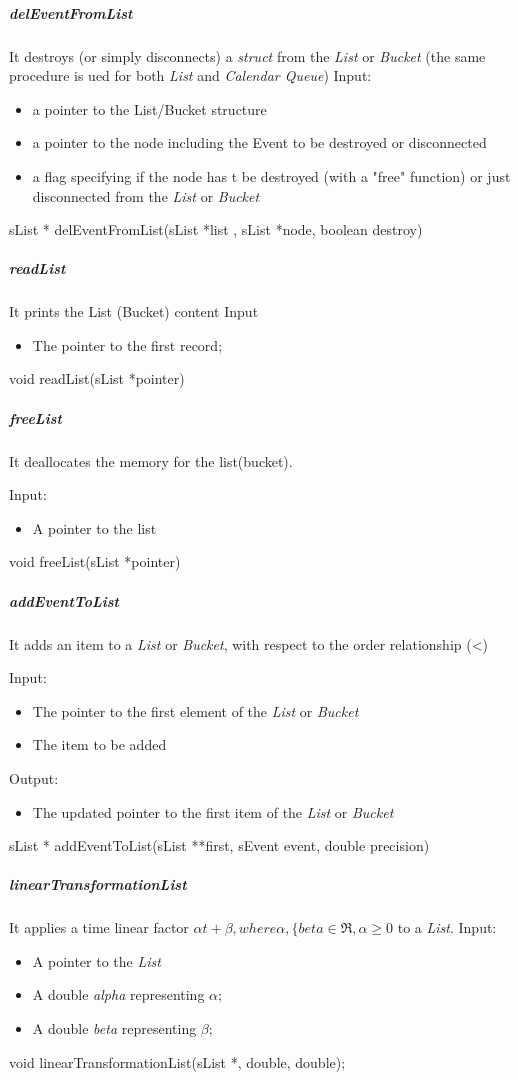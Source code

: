 \subparagraph{delEventFromList}

It destroys (or simply disconnects) a \textit{struct} from the \textit{List} or \textit{Bucket} (the same procedure is ued for both \textit{List} and \textit{Calendar Queue})
Input: 
\begin{itemize}
\item a pointer to the List/Bucket structure
\item a pointer to the node including the Event to be destroyed or disconnected
\item a flag specifying if the node has t be destroyed (with a "free" function) or just disconnected from the \textit{List} or \textit{Bucket}
\end{itemize}
sList * delEventFromList(sList *list , sList *node, boolean destroy)


\subparagraph{readList}

It prints the List (Bucket) content
Input
\begin{itemize}
\item The pointer to the first record;
\end{itemize}
void readList(sList *pointer)

\subparagraph{freeList}

It deallocates the memory for the list(bucket).

Input:
\begin{itemize}
\item A pointer to the list
\end{itemize}
void freeList(sList *pointer)

\subparagraph{addEventToList}

It adds an item to a \textit{List} or \textit{Bucket}, with respect to the order relationship (<)

Input:
\begin{itemize}
\item The pointer to the first element of the \textit{List} or \textit{Bucket}
\item The item to be added
\end{itemize}
Output:
\begin{itemize}
\item The updated pointer to the first item of the \textit{List} or \textit{Bucket}
\end{itemize}
sList * addEventToList(sList **first, sEvent event, double precision)

\subparagraph{linearTransformationList}

It applies a time linear factor \(\alpha t + \beta, where \alpha, \{beta \in \Re,
\alpha \geq 0\) to a \textit{List}. 
Input:
\begin{itemize}
\item A pointer to the \textit{List} 
\item A double \textit{alpha} representing \(\alpha;\)
\item A double \textit{beta} representing \(\beta;\)
\end{itemize}
void linearTransformationList(sList *, double, double);





